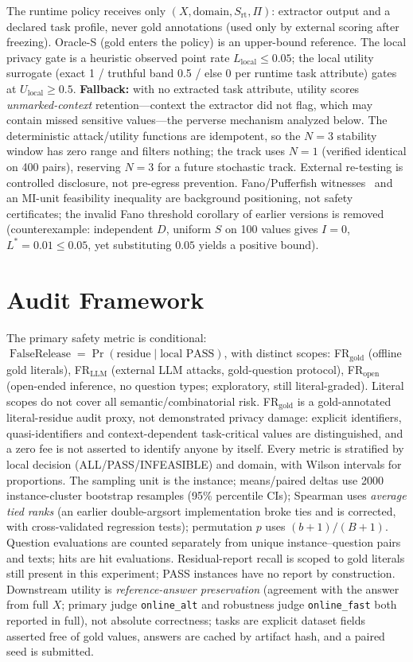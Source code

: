 \documentclass[conference]{IEEEtran}
\begin{document}
The runtime policy receives only $(X,\mathrm{domain},S_{\mathrm{rt}},\Pi)$: extractor output and a declared task profile, never gold annotations (used only by external scoring after freezing). Oracle-S (gold enters the policy) is an upper-bound reference. The local privacy gate is a heuristic observed point rate $L_{\mathrm{local}}\le0.05$; the local utility surrogate (exact 1 / truthful band 0.5 / else 0 per runtime task attribute) gates at $U_{\mathrm{local}}\ge0.5$. \textbf{Fallback:} with no extracted task attribute, utility scores \emph{unmarked-context} retention---context the extractor did not flag, which may contain missed sensitive values---the perverse mechanism analyzed below. The deterministic attack/utility functions are idempotent, so the $N=3$ stability window has zero range and filters nothing; the track uses $N=1$ (verified identical on 400 pairs), reserving $N=3$ for a future stochastic track. External re-testing is controlled disclosure, not pre-egress prevention. Fano/Pufferfish witnesses~\cite{cover2006elements,kifer2014pufferfish} and an MI-unit feasibility inequality are background positioning, not safety certificates; the invalid Fano threshold corollary of earlier versions is removed (counterexample: independent $D$, uniform $S$ on 100 values gives $I=0$, $L^*=0.01\le0.05$, yet substituting $0.05$ yields a positive bound).

\section{Audit Framework}
The primary safety metric is conditional: $\operatorname{FalseRelease}=\Pr(\text{residue}\mid\text{local PASS})$, with distinct scopes: FR$_{\mathrm{gold}}$ (offline gold literals), FR$_{\mathrm{LLM}}$ (external LLM attacks, gold-question protocol), FR$_{\mathrm{open}}$ (open-ended inference, no question types; exploratory, still literal-graded). Literal scopes do not cover all semantic/combinatorial risk. FR$_{\mathrm{gold}}$ is a gold-annotated literal-residue audit proxy, not demonstrated privacy damage: explicit identifiers, quasi-identifiers and context-dependent task-critical values are distinguished, and a zero fee is not asserted to identify anyone by itself. Every metric is stratified by local decision (ALL/PASS/INFEASIBLE) and domain, with Wilson intervals for proportions. The sampling unit is the instance; means/paired deltas use 2000 instance-cluster bootstrap resamples (95\% percentile CIs); Spearman uses \emph{average tied ranks} (an earlier double-argsort implementation broke ties and is corrected, with cross-validated regression tests); permutation $p$ uses $(b+1)/(B+1)$. Question evaluations are counted separately from unique instance--question pairs and texts; hits are hit evaluations. Residual-report recall is scoped to gold literals still present in this experiment; PASS instances have no report by construction. Downstream utility is \emph{reference-answer preservation} (agreement with the answer from full $X$; primary judge \texttt{online\_alt} and robustness judge \texttt{online\_fast} both reported in full), not absolute correctness; tasks are explicit dataset fields asserted free of gold values, answers are cached by artifact hash, and a paired seed is submitted.
\end{document}
